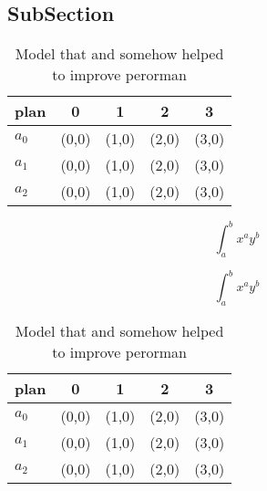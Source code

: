 \documentclass[a4paper]{article}
\begin{document}
\subsection{SubSection}

\begin{table}
\begin{adjustbox}{width=0.5\columnwidth}
\begin{tabular}{|l|l|l|l|l|}
\hline
\textbf{plan} & \multicolumn{1}{c|}{\textbf{0}} & \multicolumn{1}{c|}{\textbf{1}} & \multicolumn{1}{c|}{\textbf{2}} & \multicolumn{1}{c|}{\textbf{3}} \\ \hline
\textbf{$a_0$}  & (0,0) & (1,0) & (2,0) & (3,0) \\ \hline
\textbf{$a_1$}  & (0,0) & (1,0) & (2,0) & (3,0) \\ \hline
\textbf{$a_2$}  & (0,0) & (1,0) & (2,0) & (3,0) \\ \hline
\end{tabular}
\end{adjustbox}
\caption{Model that and somehow helped to improve perorman
}
\end{table}

\[ \int_{a}^{b}{x^{a}y^{b}} \]

\[ \int_{a}^{b}{x^{a}y^{b}} \]

\begin{table}
\begin{adjustbox}{width=0.5\columnwidth}
\begin{tabular}{|l|l|l|l|l|}
\hline
\textbf{plan} & \multicolumn{1}{c|}{\textbf{0}} & \multicolumn{1}{c|}{\textbf{1}} & \multicolumn{1}{c|}{\textbf{2}} & \multicolumn{1}{c|}{\textbf{3}} \\ \hline
\textbf{$a_0$}  & (0,0) & (1,0) & (2,0) & (3,0) \\ \hline
\textbf{$a_1$}  & (0,0) & (1,0) & (2,0) & (3,0) \\ \hline
\textbf{$a_2$}  & (0,0) & (1,0) & (2,0) & (3,0) \\ \hline
\end{tabular}
\end{adjustbox}
\caption{Model that and somehow helped to improve perorman
}
\end{table}
\end{document}
